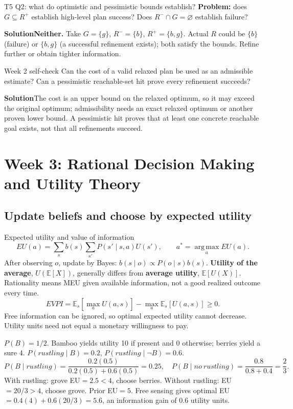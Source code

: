 \documentclass[10pt,a4paper]{article}
\newcommand{\ans}{\par\smallskip\textbf{\color{good}Solution\quad}}
\newcommand{\E}{\mathbb E}
\newcommand{\argmax}{\operatorname*{arg\,max}}
\newcommand{\topic}[1]{\clearpage\section{#1}}
\begin{document}
\begin{question}{T5 Q2: what do optimistic and pessimistic bounds establish?}\label{q:t5q2}
\textbf{Problem:} does $G\subseteq R^+$ establish high-level plan success? Does $R^-\cap G=\varnothing$ establish failure?
\ans \textbf{Neither.} Take $G=\{g\}$, $R^-=\{b\}$, $R^+=\{b,g\}$. Actual $R$ could be $\{b\}$ (failure) or $\{b,g\}$ (a successful refinement exists); both satisfy the bounds. Refine further or obtain tighter information.
\end{question}

\begin{question}{Week 2 self-check}
Can the cost of a valid relaxed plan be used as an admissible estimate? Can a pessimistic reachable-set hit prove every refinement succeeds?
\ans The cost is an upper bound on the relaxed optimum, so it may exceed the original optimum; admissibility needs an exact relaxed optimum or another proven lower bound. A pessimistic hit proves that at least one concrete reachable goal exists, not that all refinements succeed.
\end{question}

\topic{Week 3: Rational Decision Making and Utility Theory}



\subsection{Update beliefs and choose by expected utility}
\begin{card}{Expected utility and value of information}
\[
EU(a)=\sum_s b(s)\sum_{s'}P(s'\mid s,a)U(s'),\qquad a^*=\argmax_a EU(a).
\]
After observing $o$, update by Bayes: $b(s\mid o)\propto P(o\mid s)b(s)$. \textbf{Utility of the average}, $U(\E[X])$, generally differs from \textbf{average utility}, $\E[U(X)]$. Rationality means MEU given available information, not a good realized outcome every time.
\[
EVPI=\E_s[\max_aU(a,s)]-\max_a\E_s[U(a,s)]\ge0.
\]
Free information can be ignored, so optimal expected utility cannot decrease. Utility units need not equal a monetary willingness to pay.
\end{card}

\begin{idea}
$P(B)=1/2$. Bamboo yields utility 10 if present and 0 otherwise; berries yield a sure 4.
$P(rustling\mid B)=0.2$, $P(rustling\mid\neg B)=0.6$.
\[
P(B\mid rustling)=\frac{0.2(0.5)}{0.2(0.5)+0.6(0.5)}=0.25,
\quad P(B\mid no\ rustling)=\frac{0.8}{0.8+0.4}=\frac23.
\]
With rustling: grove EU$=2.5<4$, choose berries. Without rustling: EU$=20/3>4$, choose grove. Prior EU$=5$. Free sensing gives optimal EU$=0.4(4)+0.6(20/3)=5.6$, an information gain of 0.6 utility units.
\end{idea}
\end{document}
